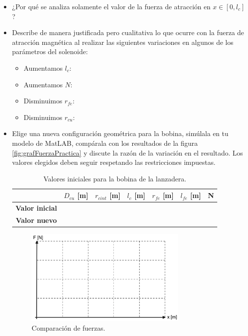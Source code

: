 \begin{itemize}
    \item ¿Por qué se analiza solamente el valor de la fuerza de atracción en \(x \in [0, l_c]\)?
    \vspace{2cm}
    \item Describe de manera justificada pero cualitativa lo que ocurre con la fuerza de atracción magnética al realizar las siguientes variaciones en algunos de los parámetros del solenoide:
    \begin{itemize}
        \item Aumentamos \(l_c\):
        \item Aumentamos \(N\):
        \item Disminuimos \(r_{fe}\):
        \item Disminuimos \(r_{cu}\):
    \end{itemize}
    \item Elige una nueva configuración geométrica para la bobina, simúlala en tu modelo de MatLAB, compárala con los resultados de la figura \ref{fig:grafFuerzaPractica} y discute la razón de la variación en el resultado. Los valores elegidos deben seguir respetando las restricciones impuestas.
    
    \begin{table}[H]
        \centering
        \setlength{\tabcolsep}{5pt}
        \renewcommand{\arraystretch}{1.2}
        \begin{tabular}{|c|c|c|c|c|c|c|}
            \hline
            \hbox{} & \textbf{\(D_{cu}\) [m]} & \textbf{\(r_{cint}\) [m]} & \textbf{\(l_c\) [m]} & \textbf{\(r_{fe}\) [m]} & \textbf{\(l_{fe}\) [m]} & \textbf{N} \\
            \hline
            \textbf{Valor inicial} &  &  &  &  &  &  \\
            \hline
            \textbf{Valor nuevo} &  &  &  &  &  &  \\
            \hline
        \end{tabular}
        \caption{Valores iniciales para la bobina de la lanzadera.}
        \label{tab:bobIniPractica}
    \end{table}

    \begin{figure}[H]
        \centering 
        \includegraphics[width=0.75\textwidth]{FigurasMemoria/grafFuerzaPractica.png}
        \caption{Comparación de fuerzas.}
        \label{fig:grafFuerzaPracticaEjercicio} %
    \end{figure}
    
\end{itemize}


